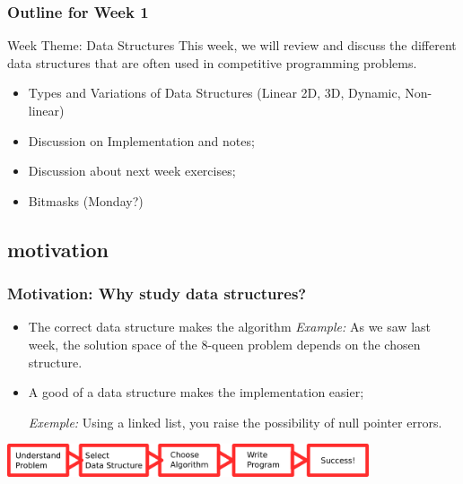 \documentclass{beamer}
\begin{document}
\begin{frame}
  \frametitle{Outline for Week 1}

  \begin{block}{Week Theme: Data Structures}
  This week, we will review and discuss the different data structures that
  are often used in competitive programming problems.
  \end{block}

  \vfill

  \begin{itemize}
  \item Types and Variations of Data Structures (Linear 2D, 3D, Dynamic, Non-linear)
  \item Discussion on Implementation and notes;
  \item Discussion about next week exercises;
  \item Bitmasks (Monday?)
  \end{itemize}
\end{frame}


\subsection{motivation}

\begin{frame}
  \frametitle{Motivation: Why study data structures?}

  \begin{itemize}
  \item The correct data structure makes the algorithm 
    \smallskip
    {\small \emph{Example:} As we saw last week, the solution space of the 
      8-queen problem depends on the chosen structure.}

    \vspace{2em}

  \item A good  of a data structure
    makes the implementation easier;

    \smallskip
    {\small \emph{Exemple:} Using a linked list, you raise the possibility of 
      null pointer errors.}
  \end{itemize}

  \begin{center}
    \includegraphics[width=0.8\textwidth]{../img/pipeline}
  \end{center}
  
\end{frame}
\end{document}
